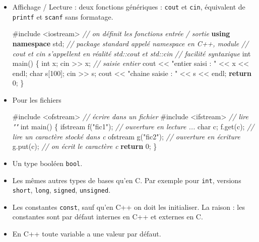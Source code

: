 \documentclass[]{article}
\newenvironment{Shaded}{}{}
\newcommand{\KeywordTok}[1]{\textcolor[rgb]{0.00,0.44,0.13}{\textbf{#1}}}
\newcommand{\DataTypeTok}[1]{\textcolor[rgb]{0.56,0.13,0.00}{#1}}
\newcommand{\DecValTok}[1]{\textcolor[rgb]{0.25,0.63,0.44}{#1}}
\newcommand{\StringTok}[1]{\textcolor[rgb]{0.25,0.44,0.63}{#1}}
\newcommand{\ImportTok}[1]{#1}
\newcommand{\CommentTok}[1]{\textcolor[rgb]{0.38,0.63,0.69}{\textit{#1}}}
\newcommand{\ControlFlowTok}[1]{\textcolor[rgb]{0.00,0.44,0.13}{\textbf{#1}}}
\newcommand{\PreprocessorTok}[1]{\textcolor[rgb]{0.74,0.48,0.00}{#1}}
\newcommand{\NormalTok}[1]{#1}
\begin{document}
\begin{itemize}
\item
  Affichage / Lecture : deux fonctions génériques : \texttt{cout} et
  \texttt{cin}, équivalent de \texttt{printf} et \texttt{scanf} sans
  formatage.

\begin{Shaded}
\begin{Highlighting}[]
\PreprocessorTok{#include }\ImportTok{<iostream>}\PreprocessorTok{ }\CommentTok{// on définit les fonctions entrée / sortie}
\KeywordTok{using} \KeywordTok{namespace}\NormalTok{ std; }\CommentTok{// package standard appelé namespace en C++, module}
\CommentTok{// cout et cin s'appellent en réalité std::cout et std::cin}
\CommentTok{// facilité syntaxique}
\DataTypeTok{int}\NormalTok{ main() \{}
    \DataTypeTok{int}\NormalTok{ x;}
\NormalTok{    cin >> x; }\CommentTok{// saisie entier}
\NormalTok{    cout << }\StringTok{"entier saisi : "}\NormalTok{ << x << endl;}
    \DataTypeTok{char}\NormalTok{ s[}\DecValTok{100}\NormalTok{];}
\NormalTok{    cin >> s;}
\NormalTok{    cout << }\StringTok{"chaine saisie : "}\NormalTok{ << s << endl;}
    \ControlFlowTok{return} \DecValTok{0}\NormalTok{;}
\NormalTok{\}}
\end{Highlighting}
\end{Shaded}
\item
  Pour les fichiers

\begin{Shaded}
\begin{Highlighting}[]
\PreprocessorTok{#include }\ImportTok{<ofstream>}\PreprocessorTok{ }\CommentTok{// écrire dans un fichier}
\PreprocessorTok{#include }\ImportTok{<ifstream>}\PreprocessorTok{ }\CommentTok{// lire ""}
\DataTypeTok{int}\NormalTok{ main() \{}
\NormalTok{    ifstream f(}\StringTok{"fic1"}\NormalTok{); }\CommentTok{// ouverture en lecture ...}
    \DataTypeTok{char}\NormalTok{ c;}
\NormalTok{    f.get(c); }\CommentTok{// lire un caractère stocké dans c}
\NormalTok{    ofstream g(}\StringTok{"fic2"}\NormalTok{); }\CommentTok{// ouverture en écriture}
\NormalTok{    g.put(c); }\CommentTok{// on écrit le caractère c}
    \ControlFlowTok{return} \DecValTok{0}\NormalTok{;}
\NormalTok{\}}
\end{Highlighting}
\end{Shaded}
\item
  Un type booléen \texttt{bool}.
\item
  Les mêmes autres types de bases qu'en C. Par exemple pour
  \texttt{int}, versions \texttt{short}, \texttt{long}, \texttt{signed},
  \texttt{unsigned}.
\item
  Les constantes \texttt{const}, sauf qu'en C++ on doit les initialiser.
  La raison : les constantes sont par défaut internes en C++ et externes
  en C.
\item
  En C++ toute variable a une valeur par défaut.


\end{itemize}
\end{document}
